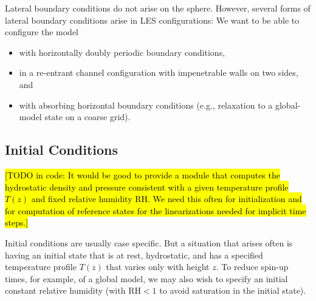 \documentclass{article}
\begin{document}
{Lateral boundary conditions do not arise on the sphere. However, several forms of lateral boundary conditions arise in LES configurations: We want to be able to configure the model
\begin{itemize}
    \item with horizontally doubly periodic boundary conditions,
    \item in a re-entrant channel configuration with impenetrable walls on two sides, and 
    \item with absorbing horizontal boundary conditions (e.g., relaxation to a global-model state on a coarse grid). 
\end{itemize}

\subsection{Initial Conditions}\label{s:initial_conditions}

\hl{[TODO in code: It would be good to provide a module that computes the hydrostatic density and pressure consistent with a given temperature profile $T(z)$ and fixed relative humidity RH. We need this often for initialization and for computation of reference states for the linearizations needed for implicit time steps.]}

Initial conditions are usually case specific. But a situation that arises often is having an initial state that is at rest, hydrostatic, and has a specified temperature profile $T(z)$ that varies only with height $z$. To reduce spin-up times, for example, of a global model, we may also wish to specify an initial constant relative humidity (with $\mathrm{RH} < 1$ to avoid saturation in the initial state).

}
\end{document}
